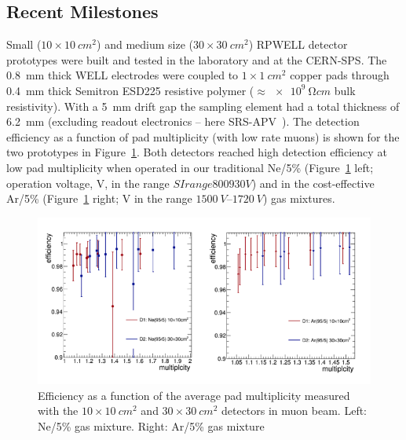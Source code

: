 \subsection{Recent Milestones}
Small ($10\times \SI{10}{cm^2}$) and medium size ($30\times \SI{30}{cm^2}$) RPWELL detector prototypes were built and tested in the laboratory and at the CERN-SPS. The \SI{0.8}{mm} thick WELL electrodes were coupled to $1\times \SI{1}{cm^2}$ copper pads through \SI{0.4}{mm} thick Semitron ESD225 resistive polymer ($\approx \SI{e9}{\ohm cm}$ bulk resistivity). With a \SI{5}{mm} drift gap the sampling element had a total thickness of \SI{6.2}{mm} (excluding readout electronics -- here SRS-APV~\cite{1748-0221-8-03-C03015,French2001359}).
The detection efficiency as a function of pad multiplicity (with low rate muons) is shown for the two prototypes in Figure~\ref{fig:Calorimeter:THGEM:efficiencyVSMultiplicity}. Both detectors reached high detection efficiency at low pad multiplicity when operated in our traditional Ne/5\% (Figure~\ref{fig:Calorimeter:THGEM:efficiencyVSMultiplicity} left; operation voltage, V, in the range $SIrange{800}{930}{V}$) and in the cost-effective Ar/5\% (Figure~\ref{fig:Calorimeter:THGEM:efficiencyVSMultiplicity} right; V in the range $\SIrange{1500}{1720}{V}$) gas mixtures.
\begin{figure}
	\centering
	\includegraphics[width=.9\textwidth]{Calorimeter/THGEM/efficiencyVSMultiplicity.png}
	\caption{Efficiency as a function of the average pad multiplicity measured with the $10\times \SI{10}{cm^2}$ and $30\times \SI{30}{cm^2}$ detectors in muon beam. Left: Ne/5\% gas mixture. Right: Ar/5\% gas mixture}
	\label{fig:Calorimeter:THGEM:efficiencyVSMultiplicity}
\end{figure}
